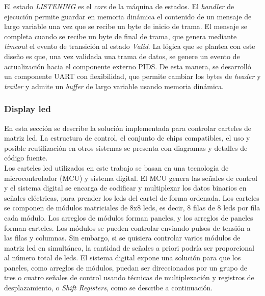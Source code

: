 El estado \textit{LISTENING} es el \textit{core} de la máquina de estados. El \textit{handler} de ejecución permite guardar en memoria dinámica el contenido de un mensaje de largo variable una vez que se recibe un byte de inicio de trama.  El mensaje se completa cuando se recibe un byte de final de trama, que genera mediante \textit{timeout} el evento de transición al estado \textit{Valid}. La lógica que se plantea con este diseño es que, una vez validada una trama de datos, se genere un evento de actualización hacia el componente externo PIDS. De esta manera, se desarrolló un componente UART con flexibilidad, que permite cambiar los bytes de \textit{header} y \textit{trailer} y admite un \textit{buffer} de largo variable usando memoria dinámica. \\

\subsubsection{Display led}

En esta sección se describe la solución implementada para controlar carteles de matriz led. La estructura de control, el conjunto de chips compatibles, el uso y posible reutilización en otros sistemas se presenta con diagramas y detalles de código fuente. \\

Los carteles led utilizados en este trabajo se basan en una tecnología de microcontrolador (MCU) y sistema digital. El MCU genera las señales de control y el sistema digital se encarga de codificar y multiplexar los datos binarios en señales eléctricas, para prender los leds del cartel de forma ordenada. Los carteles se componen de módulos matriciales de 8x8 leds, es decir, 8 filas de 8 leds por fila cada módulo. Los arreglos de módulos forman paneles, y los arreglos de paneles forman carteles. Los módulos se pueden controlar enviando pulsos de tensión a las filas y columnas. Sin embargo, si se quisiera controlar varios módulos de matriz led en simultáneo, la cantidad de señales a priori podría ser proporcional al número total de leds. El sistema digital expone una solución para que los paneles, como arreglos de módulos, puedan ser direccionados por un grupo de tres o cuatro señales de control usando técnicas de multiplexación y registros de desplazamiento, o \textit{Shift Registers}, como se describe a continuación. \\


